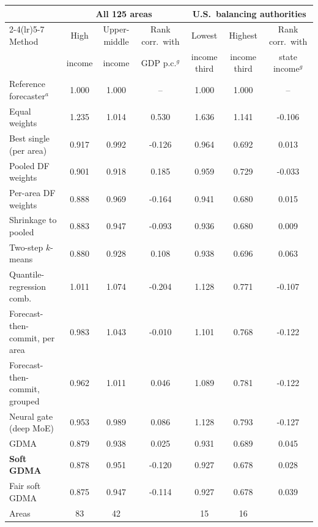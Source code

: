 \begin{tabular}{@{}lcccccc@{}}
\toprule
 & \multicolumn{3}{c}{All 125 areas} & \multicolumn{3}{c}{U.S.\ balancing authorities} \\
\cmidrule(lr){2-4}\cmidrule(lr){5-7}
Method & High & Upper-middle & Rank corr.\ with & Lowest & Highest & Rank corr.\ with \\
 & income & income & GDP p.c.$^g$ & income third & income third & state income$^g$ \\
\midrule
Reference forecaster$^a$ & 1.000 & 1.000 & -- & 1.000 & 1.000 & -- \\
Equal weights & 1.235 & 1.014 & 0.530 & 1.636 & 1.141 & -0.106 \\
Best single (per area) & 0.917 & 0.992 & -0.126 & 0.964 & 0.692 & 0.013 \\
Pooled DF weights & 0.901 & 0.918 & 0.185 & 0.959 & 0.729 & -0.033 \\
Per-area DF weights & 0.888 & 0.969 & -0.164 & 0.941 & 0.680 & 0.015 \\
Shrinkage to pooled & 0.883 & 0.947 & -0.093 & 0.936 & 0.680 & 0.009 \\
Two-step $k$-means & 0.880 & 0.928 & 0.108 & 0.938 & 0.696 & 0.063 \\
Quantile-regression comb. & 1.011 & 1.074 & -0.204 & 1.128 & 0.771 & -0.107 \\
Forecast-then-commit, per area & 0.983 & 1.043 & -0.010 & 1.101 & 0.768 & -0.122 \\
Forecast-then-commit, grouped & 0.962 & 1.011 & 0.046 & 1.089 & 0.781 & -0.122 \\
Neural gate (deep MoE) & 0.953 & 0.989 & 0.086 & 1.128 & 0.793 & -0.127 \\
GDMA & 0.879 & 0.938 & 0.025 & 0.931 & 0.689 & 0.045 \\
\textbf{Soft GDMA} & 0.878 & 0.951 & -0.120 & 0.927 & 0.678 & 0.028 \\
Fair soft GDMA & 0.875 & 0.947 & -0.114 & 0.927 & 0.678 & 0.039 \\
\midrule
Areas & 83 & 42 & & 15 & 16 & \\
\bottomrule
\end{tabular}